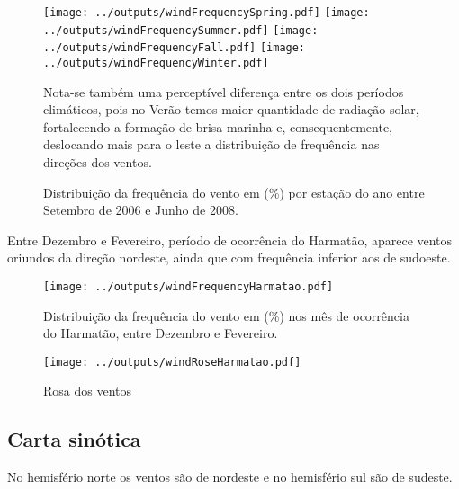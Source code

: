 \begin{figure}[H]
\begin{center}
  \texttt{[image: ../outputs/windFrequencySpring.pdf]}
  \texttt{[image: ../outputs/windFrequencySummer.pdf]}
  \texttt{[image: ../outputs/windFrequencyFall.pdf]}
  \texttt{[image: ../outputs/windFrequencyWinter.pdf]}
\end{center}

Nota-se também uma perceptível diferença entre os dois períodos climáticos, pois no Verão temos maior quantidade de radiação solar, fortalecendo a formação de brisa marinha e, consequentemente, deslocando mais para o leste a distribuição de frequência nas direções dos ventos.


\caption{Distribuição da frequência do vento em (\%) por estação do ano entre
         Setembro de 2006 e Junho de 2008.}
\end{figure}

Entre Dezembro e Fevereiro, período de ocorrência do Harmatão, aparece 
ventos oriundos da direção nordeste, ainda que com frequência inferior 
aos de sudoeste.




\begin{figure}[H]
\begin{center}
  \texttt{[image: ../outputs/windFrequencyHarmatao.pdf]}
\end{center}
\caption{Distribuição da frequência do vento em (\%) nos mês de ocorrência
         do Harmatão, entre Dezembro e Fevereiro.}
\end{figure}

\begin{figure}[H]
\begin{center}
  \texttt{[image: ../outputs/windRoseHarmatao.pdf]}
  \caption{Rosa dos ventos}
\end{center}
\end{figure}



\subsection{Carta sinótica}


No hemisfério norte os ventos são de nordeste e no hemisfério sul são de sudeste. 


